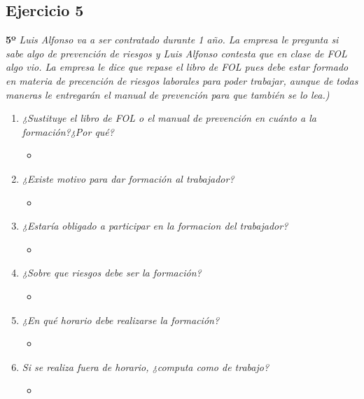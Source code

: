 \documentclass{article}
\begin{document}
      \subsection{Ejercicio 5}
        \textbf{5º} \textit{Luis Alfonso va a ser contratado durante 1 año. La empresa le pregunta si sabe algo de prevención de riesgos y Luis Alfonso contesta que en clase de FOL algo vio. La empresa le dice que repase el 
        libro de FOL pues debe estar formado en materia de precención de riesgos laborales para poder trabajar, aunque de todas maneras le entregarán el manual de prevención para que también se lo lea.)}
        \\
        \begin{enumerate}[label=(\alph*)]
          \item \textit{¿Sustituye el libro de FOL o el manual de prevención en cuánto a la formación?¿Por qué?}
            \begin{itemize}
              \item 
            \end{itemize}
          \item \textit{¿Existe motivo para dar formación al trabajador?}
            \begin{itemize}
              \item 
            \end{itemize}
          \item \textit{¿Estaría obligado a participar en la formacion del trabajador?}
            \begin{itemize}
              \item 
            \end{itemize}
          \item \textit{¿Sobre que riesgos debe ser la formación?}
            \begin{itemize}
              \item 
            \end{itemize}
          \item \textit{¿En qué horario debe realizarse la formación?}
            \begin{itemize}
              \item 
            \end{itemize}
          \item \textit{Si se realiza fuera de horario, ¿computa como de trabajo?}
            \begin{itemize}
              \item
            \end{itemize}
        \end{enumerate}
      \newpage
\end{document}

